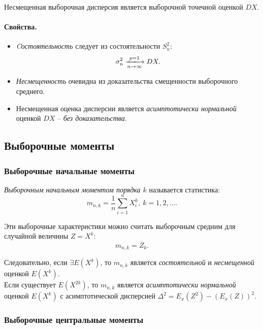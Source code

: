 Несмещенная выборочная дисперсия является выборочной точечной оценкой $DX$.

\paragraph{Свойства.}
\begin{itemize}
  \item \textit{Cостоятельность} следует из состоятельности $S^2_n$:
  \[
    \sigma^2_n \xlongrightarrow[n \to \infty]{p = 1} DX
  .\]
  \item \textit{Несмещенность} очевидна из доказательства смещенности
  выборочного среднего.

  \item Несмещенная оценка дисперсии является \textit{асимптотически нормальной}
  оценкой $DX$ -- \textit{без доказательства}.
\end{itemize}



\subsection{Выборочные моменты}

\subsubsection{Выборочные начальные моменты}

\begin{definition}
  \textit{Выборочным начальным моментом порядка $k$} называется статистика:
  \[
    m_{n, k} = \frac{1}{n} \sum\limits_{i = 1}^{n} X^k_i,~ k = 1, 2, \ldots
  .\]
\end{definition}

Эти выборочные характеристики можно считать выборочным средним для случайной
величины $Z = X^k$:
\[
  m_{n, k} = \overline{Z}_k
.\]

Следовательно, если $\exists E(X^k)$, то $m_{n, k}$ является
\textit{состоятельной} и \textit{несмещенной} оценкой $E(X^k)$.\\

Если существует $E(X^{2k})$, то $m_{n, k}$ является \textit{асимптотически
нормальной} оценкой $E(X^k)$ с асимптотической дисперсией
$\Delta^2 = E_x(Z^2) - (E_x(Z))^2$.

\subsubsection{Выборочные центральные моменты}

